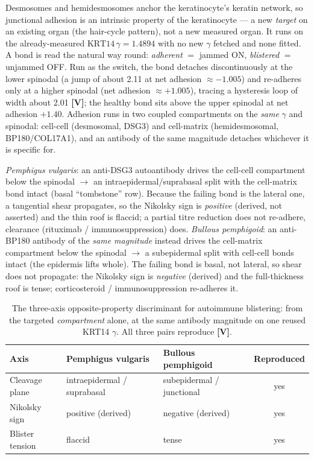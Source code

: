 \documentclass[11pt,a4paper]{article}
\newcommand{\V}{\textcolor{gV}{\textbf{[V]}}}
\newcommand{\apx}{\ensuremath{\approx}}
\begin{document}
Desmosomes and hemidesmosomes anchor the keratinocyte's keratin network, so junctional adhesion is an intrinsic
property of the keratinocyte --- a new \emph{target} on an existing organ (the hair-cycle pattern), not a new
measured organ. It runs on the already-measured $\mathrm{KRT14}\,\gamma=1.4894$ with no new $\gamma$ fetched and
none fitted. A bond is read the natural way round: \emph{adherent} $=$ jammed ON, \emph{blistered} $=$ unjammed OFF.
Run as the switch, the bond detaches discontinuously at the lower spinodal (a jump of about 2.11 at net adhesion
$\apx -1.005$) and re-adheres only at a higher spinodal (net adhesion $\apx +1.005$), tracing a hysteresis loop of
width about 2.01 \V; the healthy bond sits above the upper spinodal at net adhesion $+1.40$. Adhesion runs in two
coupled compartments on the \emph{same} $\gamma$ and spinodal: cell-cell (desmosomal, DSG3) and cell-matrix
(hemidesmosomal, BP180/COL17A1), and an antibody of the same magnitude detaches whichever it is specific for.

\emph{Pemphigus vulgaris}: an anti-DSG3 autoantibody drives the cell-cell compartment below the spinodal $\to$ an
intraepidermal/suprabasal split with the cell-matrix bond intact (basal ``tombstone'' row). Because the failing
bond is the lateral one, a tangential shear propagates, so the Nikolsky sign is \emph{positive} (derived, not
asserted) and the thin roof is flaccid; a partial titre reduction does not re-adhere, clearance (rituximab /
immunosuppression) does. \emph{Bullous pemphigoid}: an anti-BP180 antibody of the \emph{same magnitude} instead
drives the cell-matrix compartment below the spinodal $\to$ a subepidermal split with cell-cell bonds intact (the
epidermis lifts whole). The failing bond is basal, not lateral, so shear does not propagate: the Nikolsky sign is
\emph{negative} (derived) and the full-thickness roof is tense; corticosteroid / immunosuppression re-adheres it.

\begin{table}[h]
\centering\small
\caption{The three-axis opposite-property discriminant for autoimmune blistering: from the targeted
\emph{compartment} alone, at the same antibody magnitude on one reused KRT14 $\gamma$. All three pairs reproduce \V.}
\begin{tabular}{l l l c}
\toprule
\textbf{Axis} & \textbf{Pemphigus vulgaris} & \textbf{Bullous pemphigoid} & \textbf{Reproduced}\\
\midrule
Cleavage plane & intraepidermal / suprabasal & subepidermal / junctional & yes\\
Nikolsky sign  & positive (derived)          & negative (derived)        & yes\\
Blister tension& flaccid                     & tense                     & yes\\
\bottomrule
\end{tabular}
\end{table}
\end{document}

